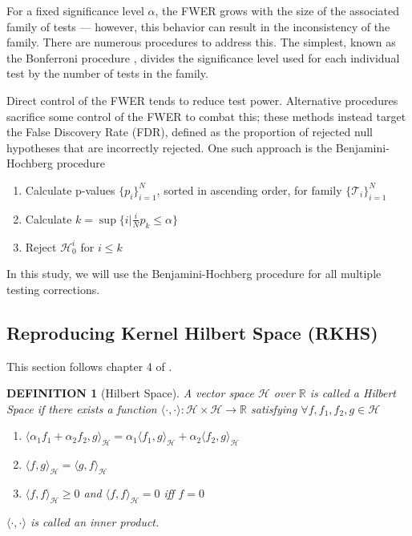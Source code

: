 \documentclass[a4paper,11pt]{article}
\newtheorem{definition}[theorem]{DEFINITION}
\begin{document}
For a fixed significance level $\alpha$, the FWER grows with the size of the associated family of tests --- however, this behavior can result in the inconsistency of the family. There are numerous procedures to address this. The simplest, known as the Bonferroni procedure \cite{bonferroni_il_1935}, divides the significance level used for each individual test by the number of tests in the family. 

Direct control of the FWER tends to reduce test power. Alternative procedures sacrifice some control of the FWER to combat this; these methods instead target the False Discovery Rate (FDR), defined as the proportion of rejected null hypotheses that are incorrectly rejected. One such approach is the Benjamini-Hochberg procedure \cite{benjamini_controlling_1995}
\begin{enumerate}
    \item Calculate p-values $\{p_{i}\}_{i=1}^{N}$, sorted in ascending order, for family $\{\mathcal{T}_{i}\}_{i=1}^{N}$
    \item Calculate $k = \sup \{i | \frac{i}{N} p_{k} \leq \alpha \} $
    \item Reject $\mathcal{H}_{0}^{i}$ for $i \leq k$
\end{enumerate}
In this study, we will use the Benjamini-Hochberg procedure for all multiple testing corrections. 

\subsection{Reproducing Kernel Hilbert Space (RKHS)}
This section follows chapter 4 of \cite{steinwart_support_2008}.

\begin{definition}[Hilbert Space]
    A vector space $\mathcal{H}$ over $\mathbb{R}$ is called a Hilbert Space if there exists a function $\langle \cdot, \cdot \rangle: \mathcal{H} \times \mathcal{H} \rightarrow \mathbb{R} $ satisfying $\forall f, f_{1}, f_{2},  g \in \mathcal{H}$
    \begin{enumerate}
        \item $\langle\alpha_{1} f_{1}+\alpha_{2} f_{2}, g\rangle_{\mathcal{H}}=\alpha_{1}\langle f_{1}, g\rangle_{\mathcal{H}}+\alpha_{2}\langle f_{2}, g\rangle_{\mathcal{H}}$ 
        \item $\langle f, g\rangle_{\mathcal{H}}=\langle g, f\rangle_{\mathcal{H}}$
        \item $\langle f, f\rangle_{\mathcal{H}} \geq 0$ and $\langle f, f\rangle_{\mathcal{H}}=0$ iff $f=0$
    \end{enumerate}
     $\langle \cdot, \cdot \rangle$ is called an inner product.
    \label{def:hilbert_space}
\end{definition}
\end{document}
